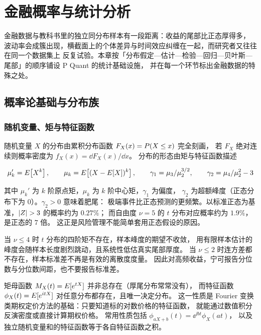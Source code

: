 \chapter{金融概率与统计分析}

金融数据与教科书里的独立同分布样本有一段距离：收益的尾部比正态厚得多，
波动率会成簇出现，横截面上的个体差异与时间效应纠缠在一起，而研究者又往往在同一个数据集上
反复试验。本章按「分布假定—估计—检验—回归—贝叶斯—尾部」的顺序铺设 P Quant 的统计基础设施，
并在每一个环节标出金融数据的特殊之处。

\section{概率论基础与分布族}

\subsection{随机变量、矩与特征函数}

随机变量 $X$ 的分布由累积分布函数 $F_X(x) = P(X \le x)$ 完全刻画，
若 $F_X$ 绝对连续则概率密度为 $f_X(x) = \dd F_X(x)/\dd x$。
分布的形态由矩与特征函数描述

\begin{equation}
  \mu_k' = E\!\left[X^{k}\right], \qquad
  \mu_k = E\!\left[(X - E[X])^{k}\right], \qquad
  \gamma_1 = \mu_3/\mu_2^{3/2}, \qquad
  \gamma_2 = \mu_4/\mu_2^{2} - 3
  \label{eq:08-moments}
\end{equation}

其中 $\mu_k'$ 为 $k$ 阶原点矩，$\mu_k$ 为 $k$ 阶中心矩，$\gamma_1$ 为偏度，
$\gamma_2$ 为超额峰度（正态分布下为 $0$）。$\gamma_2 > 0$ 意味着肥尾：
极端事件比正态预测的更频繁。以标准正态为基准，$\left\lvert Z \right\rvert > 3$ 的概率约为 $0.27\%$；
而自由度 $\nu = 5$ 的 $t$ 分布对应概率约为 $1.9\%$，是正态的 $7$ 倍。
这正是风险管理不能简单套用正态假设的原因。

\begin{warningbox}[厚尾下样本矩的失效]
当 $\nu \le 4$ 时 $t$ 分布的四阶矩不存在，样本峰度的期望不收敛，
用有限样本估计的峰度会随样本长度剧烈跳动，且系统性低估真实尾部厚度。
当 $\nu \le 2$ 时连方差都不存在，样本标准差不再是有效的离散度度量。
因此对高频收益，宁可报告分位数与分位数间距，也不要报告标准差。
\end{warningbox}

矩母函数 $M_X(t) = E[e^{tX}]$ 并非总存在（厚尾分布常常没有），
而特征函数 $\phi_X(t) = E[e^{i tX}]$ 对任意分布都存在，且唯一决定分布。
这一性质是 Fourier 变换类期权定价方法的基础：只要知道标的对数价格的特征函数，
就能通过数值积分反演密度或直接计算期权价格。
常用性质包括 $\phi_{aX+b}(t) = \ee^{\ii bt}\phi_X(at)$，
以及独立随机变量和的特征函数等于各自特征函数之积。

